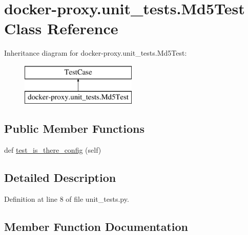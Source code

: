\hypertarget{classdocker-proxy_1_1unit__tests_1_1_md5_test}{}\section{docker-\/proxy.unit\+\_\+tests.\+Md5\+Test Class Reference}
\label{classdocker-proxy_1_1unit__tests_1_1_md5_test}
Inheritance diagram for docker-\/proxy.unit\+\_\+tests.\+Md5\+Test\+:\begin{figure}[H]
\begin{center}
\leavevmode
\includegraphics[height=2.000000cm]{classdocker-proxy_1_1unit__tests_1_1_md5_test}
\end{center}
\end{figure}
\subsection*{Public Member Functions}
\begin{DoxyCompactItemize}
\item 
def \hyperlink{classdocker-proxy_1_1unit__tests_1_1_md5_test_a964cee9ecd446be83cdd9f50ff401203}{test\+\_\+is\+\_\+there\+\_\+config} (self)
\end{DoxyCompactItemize}


\subsection{Detailed Description}


Definition at line 8 of file unit\+\_\+tests.\+py.



\subsection{Member Function Documentation}
\hypertarget{classdocker-proxy_1_1unit__tests_1_1_md5_test_a964cee9ecd446be83cdd9f50ff401203}{}\label{classdocker-proxy_1_1unit__tests_1_1_md5_test_a964cee9ecd446be83cdd9f50ff401203} 
